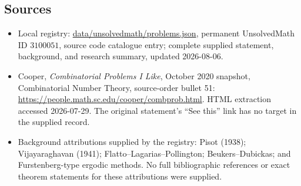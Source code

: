 \documentclass[11pt]{article}
\begin{document}
\subsection{Sources}
\begin{itemize}
\item Local registry: \url{data/unsolvedmath/problems.json}, permanent UnsolvedMath ID \(3100051\), source code catalogue entry; complete supplied statement, background, and research summary, updated 2026-08-06.
\item Cooper, \emph{Combinatorial Problems I Like}, October 2020 snapshot, Combinatorial Number Theory, source-order bullet 51: \url{https://people.math.sc.edu/cooper/combprob.html}. HTML extraction accessed 2026-07-29. The original statement's ``See this'' link has no target in the supplied record.
\item Background attributions supplied by the registry: Pisot (1938); Vijayaraghavan (1941); Flatto--Lagarias--Pollington; Beukers--Dubickas; and Furstenberg-type ergodic methods. No full bibliographic references or exact theorem statements for these attributions were supplied.
\end{itemize}
\end{document}

